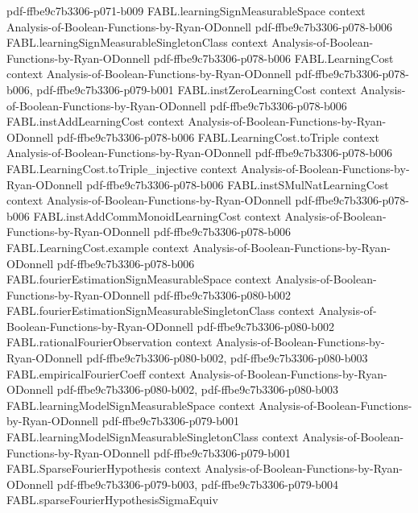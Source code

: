 \begin{theorem}
  {pdf-ffbe9c7b3306-p071-b009}
\proofstep
  {FABL.learningSignMeasurableSpace}
  {context}
  {Analysis-of-Boolean-Functions-by-Ryan-ODonnell}
  {pdf-ffbe9c7b3306-p078-b006}
\proofstep
  {FABL.learningSignMeasurableSingletonClass}
  {context}
  {Analysis-of-Boolean-Functions-by-Ryan-ODonnell}
  {pdf-ffbe9c7b3306-p078-b006}
\proofstep
  {FABL.LearningCost}
  {context}
  {Analysis-of-Boolean-Functions-by-Ryan-ODonnell}
  {pdf-ffbe9c7b3306-p078-b006,
    pdf-ffbe9c7b3306-p079-b001}
\proofstep
  {FABL.instZeroLearningCost}
  {context}
  {Analysis-of-Boolean-Functions-by-Ryan-ODonnell}
  {pdf-ffbe9c7b3306-p078-b006}
\proofstep
  {FABL.instAddLearningCost}
  {context}
  {Analysis-of-Boolean-Functions-by-Ryan-ODonnell}
  {pdf-ffbe9c7b3306-p078-b006}
\proofstep
  {FABL.LearningCost.toTriple}
  {context}
  {Analysis-of-Boolean-Functions-by-Ryan-ODonnell}
  {pdf-ffbe9c7b3306-p078-b006}
\proofstep
  {FABL.LearningCost.toTriple_injective}
  {context}
  {Analysis-of-Boolean-Functions-by-Ryan-ODonnell}
  {pdf-ffbe9c7b3306-p078-b006}
\proofstep
  {FABL.instSMulNatLearningCost}
  {context}
  {Analysis-of-Boolean-Functions-by-Ryan-ODonnell}
  {pdf-ffbe9c7b3306-p078-b006}
\proofstep
  {FABL.instAddCommMonoidLearningCost}
  {context}
  {Analysis-of-Boolean-Functions-by-Ryan-ODonnell}
  {pdf-ffbe9c7b3306-p078-b006}
\proofstep
  {FABL.LearningCost.example}
  {context}
  {Analysis-of-Boolean-Functions-by-Ryan-ODonnell}
  {pdf-ffbe9c7b3306-p078-b006}
\proofstep
  {FABL.fourierEstimationSignMeasurableSpace}
  {context}
  {Analysis-of-Boolean-Functions-by-Ryan-ODonnell}
  {pdf-ffbe9c7b3306-p080-b002}
\proofstep
  {FABL.fourierEstimationSignMeasurableSingletonClass}
  {context}
  {Analysis-of-Boolean-Functions-by-Ryan-ODonnell}
  {pdf-ffbe9c7b3306-p080-b002}
\proofstep
  {FABL.rationalFourierObservation}
  {context}
  {Analysis-of-Boolean-Functions-by-Ryan-ODonnell}
  {pdf-ffbe9c7b3306-p080-b002,
    pdf-ffbe9c7b3306-p080-b003}
\proofstep
  {FABL.empiricalFourierCoeff}
  {context}
  {Analysis-of-Boolean-Functions-by-Ryan-ODonnell}
  {pdf-ffbe9c7b3306-p080-b002,
    pdf-ffbe9c7b3306-p080-b003}
\proofstep
  {FABL.learningModelSignMeasurableSpace}
  {context}
  {Analysis-of-Boolean-Functions-by-Ryan-ODonnell}
  {pdf-ffbe9c7b3306-p079-b001}
\proofstep
  {FABL.learningModelSignMeasurableSingletonClass}
  {context}
  {Analysis-of-Boolean-Functions-by-Ryan-ODonnell}
  {pdf-ffbe9c7b3306-p079-b001}
\proofstep
  {FABL.SparseFourierHypothesis}
  {context}
  {Analysis-of-Boolean-Functions-by-Ryan-ODonnell}
  {pdf-ffbe9c7b3306-p079-b003,
    pdf-ffbe9c7b3306-p079-b004}
\proofstep
  {FABL.sparseFourierHypothesisSigmaEquiv}

\end{theorem}
